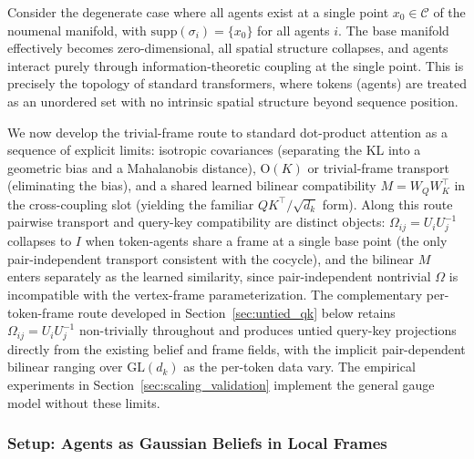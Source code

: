 \documentclass[11pt]{article}
\begin{document}
Consider the degenerate case where all agents exist at a single point $x_0 \in \mathcal{C}$ of the noumenal manifold, with $\mathrm{supp}(\sigma_i) = \{x_0\}$ for all agents $i$. The base manifold effectively becomes zero-dimensional, all spatial structure collapses, and agents interact purely through information-theoretic coupling at the single point. This is precisely the topology of standard transformers, where tokens (agents) are treated as an unordered set with no intrinsic spatial structure beyond sequence position.

We now develop the trivial-frame route to standard dot-product attention as a sequence of explicit limits: isotropic covariances (separating the KL into a geometric bias and a Mahalanobis distance), $\mathrm{O}(K)$ or trivial-frame transport (eliminating the bias), and a shared learned bilinear compatibility $M = W_QW_K^\top$ in the cross-coupling slot (yielding the familiar $QK^\top/\sqrt{d_k}$ form). Along this route pairwise transport and query-key compatibility are distinct objects: $\Omega_{ij} = U_iU_j^{-1}$ collapses to $I$ when token-agents share a frame at a single base point (the only pair-independent transport consistent with the cocycle), and the bilinear $M$ enters separately as the learned similarity, since pair-independent nontrivial $\Omega$ is incompatible with the vertex-frame parameterization. The complementary per-token-frame route developed in Section~\ref{sec:untied_qk} below retains $\Omega_{ij} = U_iU_j^{-1}$ non-trivially throughout and produces untied query-key projections directly from the existing belief and frame fields, with the implicit pair-dependent bilinear ranging over $\mathrm{GL}(d_k)$ as the per-token data vary. The empirical experiments in Section~\ref{sec:scaling_validation} implement the general gauge model without these limits.

\subsubsection{Setup: Agents as Gaussian Beliefs in Local Frames}
\end{document}
